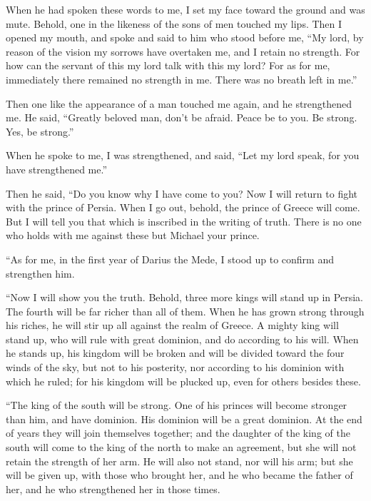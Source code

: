 \myverse{}When he had spoken these words to me, I set my face toward the
ground and was mute.
\myverse{}Behold, one in the likeness of the sons of men touched my lips. Then I opened
my mouth, and spoke and said to him who stood before me, “My lord, by reason of the vision my sorrows
have overtaken me, and I retain no strength.
\myverse{}For how can the servant of this my lord talk with this my lord? For as for
me, immediately there remained no strength in me. There was no breath left in me.”

\myverse{}Then one like the appearance of a man touched me again, and
he strengthened me.
\myverse{}He said, “Greatly beloved man, don’t be afraid. Peace be to you. Be strong.
Yes, be strong.”

When he spoke to me, I was strengthened, and said, “Let my lord speak, for you have strengthened
me.”

\myverse{}Then he said, “Do you know why I have come to you? Now I will
return to fight with the prince of Persia. When I go out, behold, the prince of Greece will come.
\myverse{}But I will tell you that which is inscribed in the writing of truth. There
is no one who holds with me against these but Michael your prince.


\mychapter{} \myverse*{}“As for me, in the first year of Darius the Mede, I stood up to
confirm and strengthen him.

\quad \myverse{}“Now I will show you the truth. Behold, three more kings will
stand up in Persia. The fourth will be far richer than all of them. When he has grown strong through his
riches, he will stir up all against the realm of Greece.
\myverse{}A mighty king will stand up, who will rule with great dominion, and do according
to his will.
\myverse{}When he stands up, his kingdom will be broken and will be divided toward the
four winds of the sky, but not to his posterity, nor according to his dominion with which he ruled; for
his kingdom will be plucked up, even for others besides these.

\myverse{}“The king of the south will be strong. One of his princes will
become stronger than him, and have dominion. His dominion will be a great dominion.
\myverse{}At the end of years they will join themselves together; and the daughter of
the king of the south will come to the king of the north to make an agreement, but she will not retain
the strength of her arm. He will also not stand, nor will his arm; but she will be given up, with those
who brought her, and he who became the father of her, and he who strengthened her in those times.

